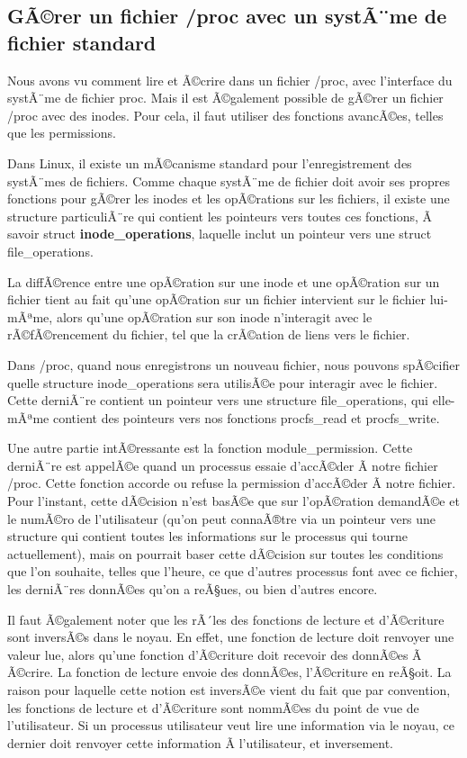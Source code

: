 \documentclass[11pt]{article}
\begin{document}
\subsection*{GÃ©rer un fichier /proc avec un systÃ¨me de fichier standard}
\label{sec-7-2}

Nous avons vu comment lire et Ã©crire dans un fichier /proc, avec l'interface du systÃ¨me de fichier proc. Mais il est Ã©galement possible de gÃ©rer un fichier /proc avec des inodes. Pour cela, il faut utiliser des fonctions avancÃ©es, telles que les permissions.

Dans Linux, il existe un mÃ©canisme standard pour l'enregistrement des systÃ¨mes de fichiers. Comme chaque systÃ¨me de fichier doit avoir ses propres fonctions pour gÃ©rer les inodes et les opÃ©rations sur les fichiers, il existe une structure particuliÃ¨re qui contient les pointeurs vers toutes ces fonctions, Ã  savoir struct \textbf{inode\_operations}, laquelle inclut un pointeur vers une struct file\_operations.

La diffÃ©rence entre une opÃ©ration sur une inode et une opÃ©ration sur un fichier tient au fait qu'une opÃ©ration sur un fichier intervient sur le fichier lui-mÃªme, alors qu'une opÃ©ration sur son inode n'interagit avec le rÃ©fÃ©rencement du fichier, tel que la crÃ©ation de liens vers le fichier.

Dans /proc, quand nous enregistrons un nouveau fichier, nous pouvons spÃ©cifier quelle structure inode\_operations sera utilisÃ©e pour interagir avec le fichier. Cette derniÃ¨re contient un pointeur vers une structure file\_operations, qui elle-mÃªme contient des pointeurs vers nos fonctions procfs\_read et procfs\_write.

Une autre partie intÃ©ressante est la fonction module\_permission. Cette derniÃ¨re est appelÃ©e quand un processus essaie d'accÃ©der Ã  notre fichier /proc. Cette fonction accorde ou refuse la permission d'accÃ©der Ã  notre fichier. Pour l'instant, cette dÃ©cision n'est basÃ©e que sur l'opÃ©ration demandÃ©e et le numÃ©ro de l'utilisateur (qu'on peut connaÃ®tre via un pointeur vers une structure qui contient toutes les informations sur le processus qui tourne actuellement), mais on pourrait baser cette dÃ©cision sur toutes les conditions que l'on souhaite, telles que l'heure, ce que d'autres processus font avec ce fichier, les derniÃ¨res donnÃ©es qu'on a reÃ§ues, ou bien d'autres encore.

Il faut Ã©galement noter que les rÃ´les des fonctions de lecture et d'Ã©criture sont inversÃ©s dans le noyau. En effet, une fonction de lecture doit renvoyer une valeur lue, alors qu'une fonction d'Ã©criture doit recevoir des donnÃ©es Ã  Ã©crire. La fonction de lecture envoie des donnÃ©es, l'Ã©criture en reÃ§oit. La raison pour laquelle cette notion est inversÃ©e vient du fait que par convention, les fonctions de lecture et d'Ã©criture sont nommÃ©es du point de vue de l'utilisateur. Si un processus utilisateur veut lire une information via le noyau, ce dernier doit renvoyer cette information Ã  l'utilisateur, et inversement.
\end{document}

